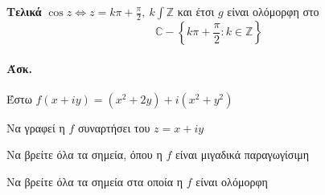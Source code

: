 \documentclass[12pt,a4paper,titlepage,fleqn]{article}
\begin{document}
\begin{enumgreekparen}
\begin{itemize}
	    	 
	    	\textbf{Τελικά} \( \cos z \iff \boxed{z=k\pi+\frac{\pi}{2},\ k
	    		\int\mathbb Z
	    		}  \) και έτσι \( g \) είναι ολόμορφη στο
	    		\[
         		\mathbb C - \left\lbrace k\pi+\frac{\pi}{2}:k\in\mathbb Z \right\rbrace
	    		\]
	    \end{itemize}

	    
	\end{enumgreekparen}
	
	\paragraph{Άσκ.}
	Έστω \( f(x+iy) = (x^2+2y)+i(x^2+y^2) \)
	\begin{enumroman}
		\item Να γραφεί η \( f \) συναρτήσει του \( z=x+iy \)
		\item Να βρείτε όλα τα σημεία, όπου η \( f \) είναι μιγαδικά παραγωγίσιμη
		\item Να βρείτε όλα τα σημεία στα οποία η \( f \) είναι ολόμορφη
	\end{enumroman}
\end{document}
